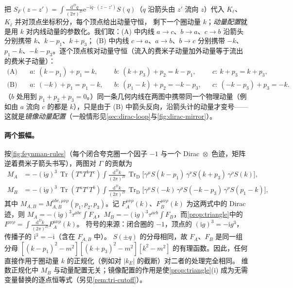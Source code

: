 \documentclass[UTF8,a4paper,11pt,fontset=fandol]{ctexart}
\theoremstyle{cplain}
\theoremstyle{cdefinition}
\theoremstyle{cremark}
\numberwithin{equation}{section}
\DeclareMathOperator{\Tr}{Tr}
\newcommand{\TrD}{\operatorname{Tr}_{\mathrm{D}}}   %
\newcommand{\dd}{\mathrm{d}}                         %
\newcommand{\SF}{S_{F}}                              %
\newcommand{\ii}{\mathrm{i}}                        %
\newcommand{\ee}{\mathrm{e}}                        %
\begin{document}
把 $\SF(z-z')=\int\frac{\dd^Dq}{(2\pi)^D}\ee^{-\ii q\cdot(z-z')}S(q)$（$q$ 沿箭头由 $z'$ 流向 $z$）代入 $K_\ell$、$K_{\bar\ell}$ 并对顶点坐标积分，每个顶点给出动量守恒，
剩下一个圈动量 $k$；\emph{动量配置}就是用 $k$ 对内线动量的参数化。我们取：(A) 中内线 $a\to c$、$b\to a$、$c\to b$ 沿箭头分别携带 $k$、$k-p_1$、$k+p_3$；
(B) 中内线 $c\to a$、$a\to b$、$b\to c$ 分别携带 $-k$、$p_1-k$、$-k-p_3$。逐个顶点核对动量守恒（流入的费米子动量加外动量等于流出的费米子动量）：
\begin{equation}\label{eq:tri-conservation}
\begin{aligned}
\text{(A)}\quad & a:\ (k-p_1)+p_1=k, && b:\ (k+p_3)+p_2=k-p_1, && c:\ k+p_3=k+p_3,\\
\text{(B)}\quad & a:\ (-k)+p_1=p_1-k, && b:\ (p_1-k)+p_2=-k-p_3, && c:\ (-k-p_3)+p_3=-k .
\end{aligned}
\end{equation}
（$b$ 处用到 $p_1+p_2+p_3=0$。）同一条几何内线在两图中携带同一个物理动量（例如由 $a$ 流向 $c$ 的都是 $k$），只是由于 (B) 中箭头反向，沿箭头计的动量才变号——这就是\emph{镜像动量配置}（一般情形见\cref{sec:dirac-loop}与\cref{fig:dirac-mirror}）。

\paragraph{两个振幅。}
按\cref{fig:feynman-rules}（每个闭合夸克圈一个因子 $-1$ 与一个 Dirac~$\otimes$~色迹，矩阵逆着费米子箭头书写），两图对 $\Gamma$ 的贡献为
\begin{align}
M_A&=-(\ii g)^3\,\Tr(T^aT^bT^c)\int\frac{\dd^Dk}{(2\pi)^D}\,\TrD\bigl[\gamma^\mu S(k-p_1)\,\gamma^\nu S(k+p_3)\,\gamma^\rho S(k)\bigr],\label{eq:tri-MA}\\
M_B&=-(\ii g)^3\,\Tr(T^aT^cT^b)\int\frac{\dd^Dk}{(2\pi)^D}\,\TrD\bigl[\gamma^\mu S(-k)\,\gamma^\rho S(-k-p_3)\,\gamma^\nu S(p_1-k)\bigr],\label{eq:tri-MB}
\end{align}
其中 $M_{A,B}=M_{A,B}^{abc,\mu\nu\rho}(p_1,p_2,p_3)$。记 $F_A^{\mu\nu\rho}(k)$、$F_B^{\mu\nu\rho}(k)$ 为这两式中的 Dirac 迹，则
$M_A=-(\ii g)^3\tau^{abc}\!\int\!F_A$，$M_B=-(\ii g)^3\tau^{acb}\!\int\!F_B$，而\cref{prop:triangle}中的 $I^{\mu\nu\rho}=\int\frac{\dd^Dk}{(2\pi)^D}F_A^{\mu\nu\rho}(k)$。
符号的来源：闭合圈的 $-1$，顶点的 $(\ii g)^3=-\ii g^3$，传播子的 $\ii^3=-\ii$（含在 $F_{A,B}$ 中）。
$S(\pm q)$ 的分母相同，故 $F_A$、$F_B$ 是同一组分母 $[(k-p_1)^2-m^2][(k+p_3)^2-m^2][k^2-m^2]$ 的有理函数。因此，任何直接作用于圈动量 $k$ 的正规化（例如对 $|k_E|$ 的截断）对二者的处理完全相同。
维数正规化中 $M_B$ 与动量配置无关；镜像配置的作用是使\cref{prop:triangle}(i) 成为无需变量替换的逐点恒等式（另见\cref{rem:tri-cutoff}）。
\end{document}
